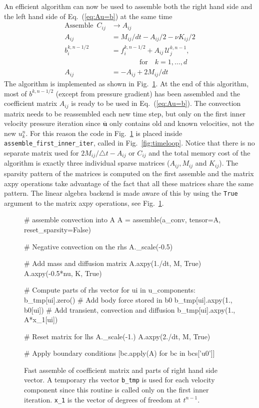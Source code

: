 \documentclass[final,3p,times,twocolumn]{elsarticle}
\newcommand{\inpyth}{\lstinline[style=inlinestyle]} %[]%
\begin{document}
An efficient algorithm can now be used to assemble both the right hand side and the left hand side of Eq.~(\ref{eq:Au=b}) at the same time
\begin{align*}
        \text{Assemble}\,\,\, C_{ij} &\longrightarrow A_{ij} \\
        A_{ij} &= M_{ij}/dt - A_{ij}/2-\nu K_{ij}/2 \\      
        b_i^{k, n-1/2} &= f_i^{k, n-1/2} + A_{ij}\,\mathcal{U}_j^{k, n-1}, \\
        & \quad\quad\quad\quad \text{for}\quad k=1,\ldots, d \\
        A_{ij} &= -A_{ij} + 2M_{ij}/dt
\end{align*}
The algorithm is implemented as shown in Fig.~\ref{fig:assemble_first_inner_iter}. At the end of this algorithm, most of $b^{k, n-1/2}$ (except from pressure gradient) has been assembled and the coefficient matrix $A_{ij}$ is ready to be used in Eq.~(\ref{eq:Au=b}). The convection matrix needs to be reassembled each new time step, but only on the first inner velocity pressure iteration since $\overline{\bm{u}}$ only contains old and known velocities, not the new $u_k^{n}$. For this reason the code in Fig.~\ref{fig:assemble_first_inner_iter} is placed inside  \inpyth{assemble_first_inner_iter}, called in Fig.~\ref{fig:timeloop}. Notice that there is no separate matrix used for $2M_{ij}/\triangle t - A_{ij}$ or $C_{ij}$ and the total memory cost of the algorithm is exactly three individual sparse matrices ($A_{ij}, M_{ij}$ and $K_{ij}$). The sparsity pattern of the matrices is computed on the first assemble and the matrix axpy operations take advantage of the fact that all these matrices share the same pattern. The linear algebra backend is made aware of this by using the \inpyth{True} argument to the matrix axpy operations, see Fig.~\ref{fig:assemble_first_inner_iter}.
\begin{figure}
\begin{python}
# assemble convection into A
A = assemble(a_conv, tensor=A, 
             reset_sparsity=False) 
  
# Negative convection on the rhs 
A._scale(-0.5)            
  
# Add mass and diffusion matrix
A.axpy(1./dt, M, True)
A.axpy(-0.5*nu, K, True) 
  
# Compute parts of rhs vector
for ui in u_components:
  b_tmp[ui].zero()
  # Add body force stored in b0
  b_tmp[ui].axpy(1., b0[ui])
  # Add transient, convection and diffusion
  b_tmp[ui].axpy(1., A*x_1[ui])
        
# Reset matrix for lhs
A._scale(-1.)
A.axpy(2./dt, M, True)
  
# Apply boundary conditions
[bc.apply(A) for bc in bcs['u0']]
  
\end{python}
\caption{Fast assemble of coefficient matrix and parts of right hand side vector. A temporary rhs vector \inpyth{b_tmp} is used for each velocity component since this routine is called only on the first inner iteration. \inpyth{x_1} is the vector of degrees of freedom at $t^{n-1}$.}
\label{fig:assemble_first_inner_iter}
\end{figure}
\end{document}
